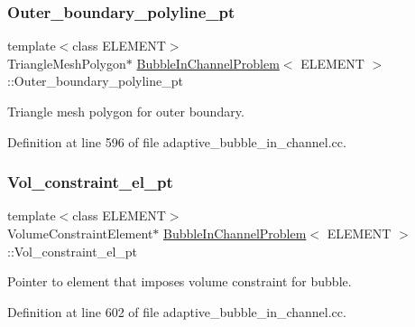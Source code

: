 \subsubsection{\texorpdfstring{Outer\+\_\+boundary\+\_\+polyline\+\_\+pt}{Outer\_boundary\_polyline\_pt}}
{\footnotesize\ttfamily template$<$class E\+L\+E\+M\+E\+NT$>$ \\
Triangle\+Mesh\+Polygon$\ast$ \hyperlink{classBubbleInChannelProblem}{Bubble\+In\+Channel\+Problem}$<$ E\+L\+E\+M\+E\+NT $>$\+::Outer\+\_\+boundary\+\_\+polyline\+\_\+pt\hspace{0.3cm}{\ttfamily [private]}}



Triangle mesh polygon for outer boundary. 



Definition at line 596 of file adaptive\+\_\+bubble\+\_\+in\+\_\+channel.\+cc.

\mbox{\label{classBubbleInChannelProblem_ac0343258f630d7c0886cca51ba57e80d}} 
\subsubsection{\texorpdfstring{Vol\+\_\+constraint\+\_\+el\+\_\+pt}{Vol\_constraint\_el\_pt}}
{\footnotesize\ttfamily template$<$class E\+L\+E\+M\+E\+NT$>$ \\
Volume\+Constraint\+Element$\ast$ \hyperlink{classBubbleInChannelProblem}{Bubble\+In\+Channel\+Problem}$<$ E\+L\+E\+M\+E\+NT $>$\+::Vol\+\_\+constraint\+\_\+el\+\_\+pt\hspace{0.3cm}{\ttfamily [private]}}



Pointer to element that imposes volume constraint for bubble. 



Definition at line 602 of file adaptive\+\_\+bubble\+\_\+in\+\_\+channel.\+cc.

\mbox{\label{classBubbleInChannelProblem_a341644d44c22ff16c9023b614f0c6471}} 
